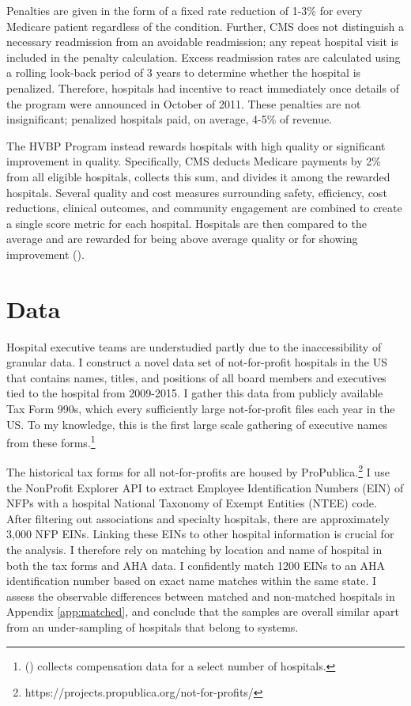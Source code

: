\documentclass[12pt]{article}
\begin{document}
    Penalties are given in the form of a fixed rate reduction of 1-3\% for every Medicare patient regardless of the condition. Further, CMS does not distinguish a necessary readmission from an avoidable readmission; any repeat hospital visit is included in the penalty calculation. Excess readmission rates are calculated using a rolling look-back period of 3 years to determine whether the hospital is penalized. Therefore, hospitals had incentive to react immediately once details of the program were announced in October of 2011. These penalties are not insignificant; penalized hospitals paid, on average, 4-5\% of revenue. 

    The HVBP Program instead rewards hospitals with high quality or significant improvement in quality. Specifically, CMS deducts Medicare payments by 2\% from all eligible hospitals, collects this sum, and divides it among the rewarded hospitals. Several quality and cost measures surrounding safety, efficiency, cost reductions, clinical outcomes, and community engagement are combined to create a single score metric for each hospital. Hospitals are then compared to the average and are rewarded for being above average quality or for showing improvement (\cite{CMS_2023}). 

    

	\section{Data}\label{sec:data}

    Hospital executive teams are understudied partly due to the inaccessibility of granular data. I construct a novel data set of not-for-profit hospitals in the US that contains names, titles, and positions of all board members and executives tied to the hospital from 2009-2015. I gather this data from publicly available Tax Form 990s, which every sufficiently large not-for-profit files each year in the US. To my knowledge, this is the first large scale gathering of executive names from these forms.\footnote{\citeauthor{brickley2010board} (\citeyear{brickley2010board}) collects compensation data for a select number of hospitals.} 

    The historical tax forms for all not-for-profits are housed by ProPublica.\footnote{https://projects.propublica.org/not-for-profits/} I use the NonProfit Explorer API to extract Employee Identification Numbers (EIN) of NFPs with a hospital National Taxonomy of Exempt Entities (NTEE) code. After filtering out associations and specialty hospitals, there are approximately 3,000 NFP EINs. Linking these EINs to other hospital information is crucial for the analysis. I therefore rely on matching by location and name of hospital in both the tax forms and AHA data. I confidently match 1200 EINs to an AHA identification number based on exact name matches within the same state. I assess the observable differences between matched and non-matched hospitals in Appendix \ref{app:matched}, and conclude that the samples are overall similar apart from an under-sampling of hospitals that belong to systems.
    
\end{document}
